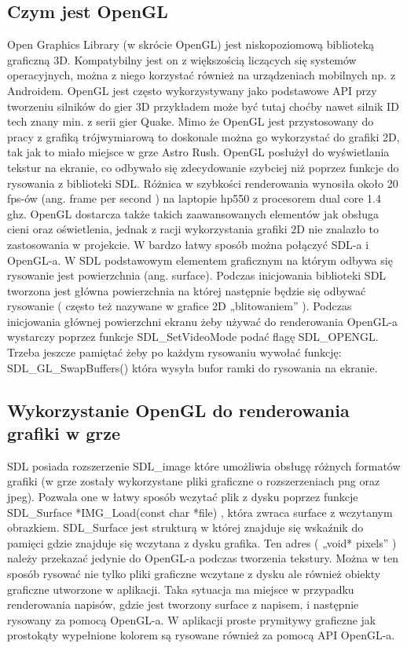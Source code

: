 \subsection{Czym jest OpenGL}
Open Graphics Library (w skrócie OpenGL) jest niskopoziomową biblioteką  graficzną 3D. Kompatybilny jest on z większością liczących się systemów
operacyjnych, można z niego korzystać również na urządzeniach mobilnych np. z Androidem. OpenGL jest często wykorzystywany jako podstawowe API przy tworzeniu silników do gier 3D przykładem może
być tutaj choćby nawet silnik ID tech znany min. z serii gier Quake. Mimo że OpenGL jest przystosowany do pracy z grafiką trójwymiarową to doskonale
można go wykorzystać do grafiki 2D, tak jak to miało miejsce w grze Astro Rush. OpenGL posłużył do wyświetlania tekstur na ekranie, co odbywało się
zdecydowanie szybciej niż poprzez funkcje do rysowania z biblioteki SDL.  Różnica w szybkości renderowania wynosiła około 20 fps-ów (ang. frame per second ) na
laptopie hp550 z procesorem dual core 1.4 ghz. OpenGL dostarcza także takich zaawansowanych elementów jak obsługa cieni oraz oświetlenia, jednak z
racji wykorzystania grafiki 2D nie znalazło to zastosowania w projekcie.
	W bardzo łatwy sposób można połączyć SDL-a i OpenGL-a.
W SDL podstawowym elementem graficznym na którym odbywa się rysowanie jest powierzchnia (ang. surface). Podczas inicjowania biblioteki SDL tworzona
jest główna powierzchnia na której następnie będzie się odbywać rysowanie ( często też nazywane w grafice 2D „blitowaniem” ). Podczas inicjowania
głównej powierzchni ekranu żeby używać do renderowania OpenGL-a wystarczy poprzez funkcje SDL\_SetVideoMode podać flagę SDL\_OPENGL. Trzeba jeszcze
pamiętać żeby po każdym rysowaniu wywołać funkcję: SDL\_GL\_SwapBuffers() która wysyła bufor ramki do rysowania na ekranie.


\subsection{Wykorzystanie OpenGL do renderowania grafiki w grze}
SDL posiada rozszerzenie SDL\_image które umożliwia obsługę różnych formatów grafiki (w grze zostały wykorzystane pliki graficzne o rozszerzeniach png oraz jpeg). Pozwala one w łatwy sposób wczytać plik z dysku poprzez funkcje SDL\_Surface *IMG\_Load(const char *file) , która zwraca surface z
wczytanym obrazkiem. SDL\_Surface jest strukturą w której znajduje się wskaźnik do pamięci gdzie znajduje się wczytana z dysku grafika. Ten adres (
„void* pixels” ) należy przekazać jedynie do OpenGL-a podczas tworzenia tekstury.
Można w ten sposób rysować nie tylko pliki graficzne wczytane z dysku ale również obiekty graficzne utworzone w aplikacji. Taka sytuacja ma miejsce w
przypadku renderowania napisów, gdzie jest tworzony surface z napisem, i następnie rysowany za pomocą OpenGL-a. W aplikacji proste prymitywy graficzne
jak prostokąty wypełnione kolorem są rysowane również za pomocą API OpenGL-a.


